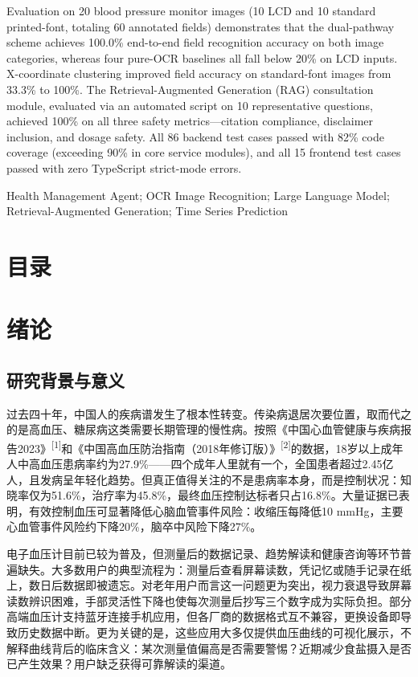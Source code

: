 \documentclass[zihao=-4,a4paper]{ctexart}
\numberwithin{figure}{section}
\numberwithin{table}{section}
\begin{document}
{Evaluation on 20 blood pressure monitor images (10 LCD and 10 standard printed-font, totaling 60 annotated fields) demonstrates that the dual-pathway scheme achieves 100.0\% end-to-end field recognition accuracy on both image categories, whereas four pure-OCR baselines all fall below 20\% on LCD inputs. X-coordinate clustering improved field accuracy on standard-font images from 33.3\% to 100\%. The Retrieval-Augmented Generation (RAG) consultation module, evaluated via an automated script on 10 representative questions, achieved 100\% on all three safety metrics---citation compliance, disclaimer inclusion, and dosage safety. All 86 backend test cases passed with 82\% code coverage (exceeding 90\% in core service modules), and all 15 frontend test cases passed with zero TypeScript strict-mode errors.
}

\vspace{1cm}
 Health Management Agent; OCR Image Recognition; Large Language Model; Retrieval-Augmented Generation; Time Series Prediction

\newpage
\section*{目\hspace{2em}录}
\tableofcontents
\newpage

\section{绪论}

\subsection{研究背景与意义}

过去四十年，中国人的疾病谱发生了根本性转变。传染病退居次要位置，取而代之的是高血压、糖尿病这类需要长期管理的慢性病。按照《中国心血管健康与疾病报告2023》\textsuperscript{[1]}和《中国高血压防治指南（2018年修订版）》\textsuperscript{[2]}的数据，18岁以上成年人中高血压患病率约为27.9\%——四个成年人里就有一个，全国患者超过2.45亿人，且发病呈年轻化趋势。但真正值得关注的不是患病率本身，而是控制状况：知晓率仅为51.6\%，治疗率为45.8\%，最终血压控制达标者只占16.8\%。大量证据已表明，有效控制血压可显著降低心脑血管事件风险：收缩压每降低10 mmHg，主要心血管事件风险约下降20\%，脑卒中风险下降27\%。

电子血压计目前已较为普及，但测量后的数据记录、趋势解读和健康咨询等环节普遍缺失。大多数用户的典型流程为：测量后查看屏幕读数，凭记忆或随手记录在纸上，数日后数据即被遗忘。对老年用户而言这一问题更为突出，视力衰退导致屏幕读数辨识困难，手部灵活性下降也使每次测量后抄写三个数字成为实际负担。部分高端血压计支持蓝牙连接手机应用，但各厂商的数据格式互不兼容，更换设备即导致历史数据中断。更为关键的是，这些应用大多仅提供血压曲线的可视化展示，不解释曲线背后的临床含义：某次测量值偏高是否需要警惕？近期减少食盐摄入是否已产生效果？用户缺乏获得可靠解读的渠道。
\end{document}
